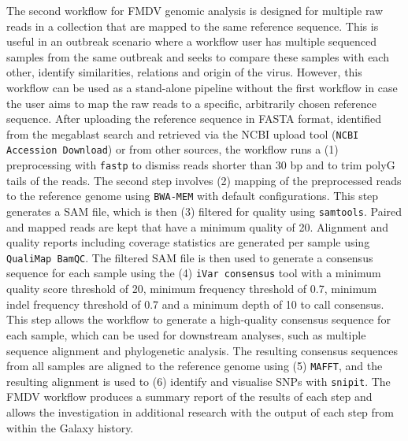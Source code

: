 The second workflow for \ac{FMDV} genomic analysis is designed for multiple raw reads in a collection that are mapped to the same reference sequence. This is useful in an outbreak scenario where a workflow user has multiple sequenced samples from the same outbreak and seeks to compare these samples with each other, identify similarities, relations and origin of the virus. However, this workflow can be used as a stand-alone pipeline without the first workflow in case the user aims to map the raw reads to a specific, arbitrarily chosen reference sequence. After uploading the reference sequence in FASTA format, identified from the megablast search and retrieved via the \ac{NCBI} upload tool (\texttt{NCBI Accession Download}) or from other sources, the workflow runs a (1) preprocessing with \texttt{fastp} to dismiss reads shorter than 30 bp and to trim polyG tails of the reads. The second step involves (2) mapping of the preprocessed reads to the reference genome using \texttt{BWA-MEM} with default configurations. This step generates a \ac{SAM} file, which is then (3) filtered for quality using \texttt{samtools}. Paired and mapped reads are kept that have a minimum quality of 20. Alignment and quality reports including coverage statistics are generated per sample using \texttt{QualiMap BamQC}. The filtered \ac{SAM} file is then used to generate a consensus sequence for each sample using the (4) \texttt{iVar consensus} tool with a minimum quality score threshold of 20, minimum frequency threshold of 0.7, minimum indel frequency threshold of 0.7 and a minimum depth of 10 to call consensus. This step allows the workflow to generate a high-quality consensus sequence for each sample, which can be used for downstream analyses, such as multiple sequence alignment and phylogenetic analysis. The resulting consensus sequences from all samples are aligned to the reference genome using (5) \texttt{MAFFT}, and the resulting alignment is used to (6) identify and visualise \acs{SNP}s with \texttt{snipit}. The \ac{FMDV} workflow produces a summary report of the results of each step and allows the investigation in additional research with the output of each step from within the Galaxy history. 
